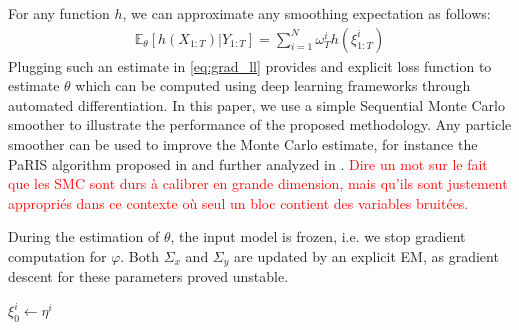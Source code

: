 \documentclass{article}
\begin{document}
For any function $h$, we can approximate any smoothing expectation as follows:
\begin{align*}
	\mathbb{E}_\theta \left[ h(X_{1:T}) | Y_{1:T} \right] = \sum_{i=1}^N \omega_T^i h(\xi^i_{1:T})
\end{align*}
Plugging such an estimate in \ref{eq:grad_ll} provides and explicit loss function to estimate $\theta$ which can be computed using deep learning frameworks through automated differentiation. In this paper, we use a simple Sequential Monte Carlo smoother to illustrate the performance of the proposed methodology. Any particle smoother can be used to improve the Monte Carlo estimate, for instance the PaRIS algorithm proposed in \cite{} and further analyzed in \cite{}. \textcolor{red}{Dire un mot sur le fait que les SMC sont durs à calibrer en grande dimension, mais qu'ils sont justement appropriés dans ce contexte où seul un bloc contient des variables bruitées.}

During the estimation of $\theta$, the input model is frozen, i.e. we stop gradient computation for $\varphi$. Both $\Sigma_x$ and $\Sigma_y$ are updated by an explicit EM, as gradient descent for these parameters proved unstable.

\begin{algorithm}
	$\xi_0^i \gets \eta^i$\;
	\caption{Particle filter. $\varphi_{\mu, \Sigma}$ is the multivariate normal density function with mean $\mu$ and covariance matrix $\Sigma$. \textcolor{red}{Peut-être plutôt un algorithme complet avec toutes les étapes : pré-entraînement de $\varphi$, approximation du gradient, mise \`a jour des paramètres.}}
	\label{algo:particle_filter}
\end{algorithm}
\end{document}

